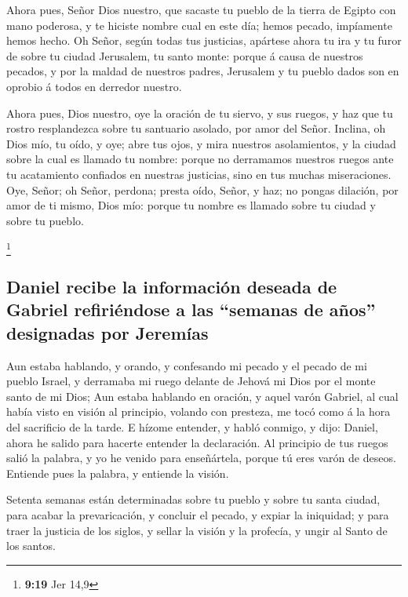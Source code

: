  Ahora pues, Señor Dios nuestro, que sacaste tu pueblo de
la tierra de Egipto con mano poderosa, y te hiciste nombre cual en este
día; hemos pecado, impíamente hemos hecho.  Oh Señor,
según todas tus justicias, apártese ahora tu ira y tu furor de sobre tu
ciudad Jerusalem, tu santo monte: porque á causa de nuestros pecados, y
por la maldad de nuestros padres, Jerusalem y tu pueblo dados son en
oprobio á todos en derredor nuestro.

 Ahora pues, Dios nuestro, oye la oración de tu siervo, y
sus ruegos, y haz que tu rostro resplandezca sobre tu santuario asolado,
por amor del Señor.  Inclina, oh Dios mío, tu oído, y
oye; abre tus ojos, y mira nuestros asolamientos, y la ciudad sobre la
cual es llamado tu nombre: porque no derramamos nuestros ruegos ante tu
acatamiento confiados en nuestras justicias, sino en tus muchas
miseraciones.  Oye, Señor; oh Señor, perdona; presta
oído, Señor, y haz; no pongas dilación, por amor de ti mismo, Dios mío:
porque tu nombre es llamado sobre tu ciudad y sobre tu pueblo.

\footnote{\textbf{9:19} Jer 14,9}

\hypertarget{daniel-recibe-la-informaciuxf3n-deseada-de-gabriel-refiriuxe9ndose-a-las-semanas-de-auxf1os-designadas-por-jeremuxedas}{%
\subsection{Daniel recibe la información deseada de Gabriel refiriéndose
a las ``semanas de años'' designadas por
Jeremías}\label{daniel-recibe-la-informaciuxf3n-deseada-de-gabriel-refiriuxe9ndose-a-las-semanas-de-auxf1os-designadas-por-jeremuxedas}}

 Aun estaba hablando, y orando, y confesando mi pecado y
el pecado de mi pueblo Israel, y derramaba mi ruego delante de Jehová mi
Dios por el monte santo de mi Dios;  Aun estaba hablando
en oración, y aquel varón Gabriel, al cual había visto en visión al
principio, volando con presteza, me tocó como á la hora del sacrificio
de la tarde.  E hízome entender, y habló conmigo, y dijo:
Daniel, ahora he salido para hacerte entender la declaración.
 Al principio de tus ruegos salió la palabra, y yo he
venido para enseñártela, porque tú eres varón de deseos. Entiende pues
la palabra, y entiende la visión.

 Setenta semanas están determinadas sobre tu pueblo y
sobre tu santa ciudad, para acabar la prevaricación, y concluir el
pecado, y expiar la iniquidad; y para traer la justicia de los siglos, y
sellar la visión y la profecía, y ungir al Santo de los santos.

